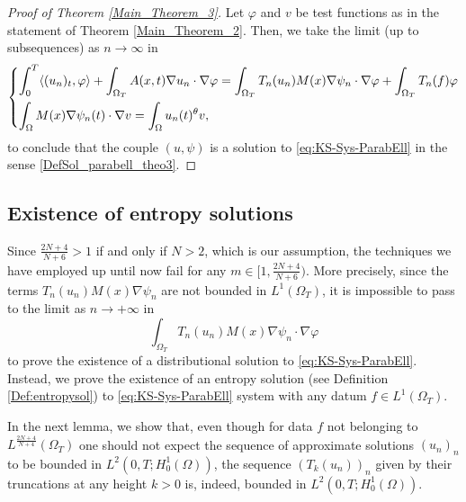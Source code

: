 \documentclass{amsart}
\numberwithin{equation}{section}
\def\elle#1{L^{#1}}
\def\elleomT#1{L^{#1}(\Omega_T)}
\def\Hom{H^1_0(\Omega)}
\def\io{\int_\Omega}
\def\ioT{\int_{\Omega_T}}
\begin{document}
\begin{proof}[Proof of Theorem \ref{Main_Theorem_3}]
    Let $\varphi$ and $v$ be test functions as in the statement of Theorem \ref{Main_Theorem_2}. Then, we take the limit (up to subsequences) as $n\to\infty$ in 
    \begin{equation}
        \begin{dcases}
                \int_0^T \langle (u_n)_t,\varphi\rangle+\ioT A(x,t)\nabla u_n\cdot \nabla \varphi = \ioT T_n(u_n) M(x)\nabla \psi_n\cdot\nabla\varphi + \ioT T_n(f)\varphi\\
                \io M(x)\nabla \psi_n(t)\cdot\nabla v = \io u_n(t)^\theta v,
        \end{dcases}
    \end{equation}
    to conclude that the couple $(u,\psi)$ is a solution to \eqref{eq:KS-Sys-ParabEll} in the sense \eqref{DefSol_parabell_theo3}.
\end{proof}

\subsection{Existence of entropy solutions}\label{sec:entropy}

Since $\frac{2N+4}{N+6}>1$ if and only if $N>2$, which is our assumption, the techniques we have employed up until now fail for any $m\in [1,\frac{2N+4}{N+6})$. 
More precisely, since the terms $T_n(u_n)M(x)\nabla\psi_n$ are not bounded in $\elleomT1$, it is impossible to pass to the limit as $n\to+\infty$ in 
\[
\ioT T_n(u_n)M(x)\nabla\psi_n\cdot\nabla\varphi
\]
to prove the existence of a distributional solution to \eqref{eq:KS-Sys-ParabEll}. 
Instead, we prove the existence of an entropy solution (see Definition \ref{Def:entropysol}) to \eqref{eq:KS-Sys-ParabEll} system with any datum $f\in\elleomT1$.

In the next lemma, we show that, even though for data $f$ not belonging to $\elleomT{\frac{2N+4}{N+4}}$ one should not expect the sequence of approximate solutions $(u_n)_n$ to be bounded in $\elle2(0,T;\Hom)$, the sequence $(T_k(u_n))_n$ given by their truncations at any height $k>0$ is, indeed, bounded in $\elle2(0,T;\Hom)$.
\end{document}
